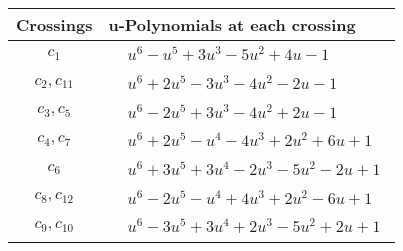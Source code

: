 \documentclass[1p]{elsarticle_modified}
\theoremstyle{definition}
\begin{document}
\begin{tabular}{m{50pt}|m{274pt}}
Crossings & \hspace{64pt}u-Polynomials at each crossing \\
\hline $$\begin{aligned}c_{1}\end{aligned}$$&$\begin{aligned}
&u^6- u^5+3 u^3-5 u^2+4 u-1
\end{aligned}$\\
\hline $$\begin{aligned}c_{2},c_{11}\end{aligned}$$&$\begin{aligned}
&u^6+2 u^5-3 u^3-4 u^2-2 u-1
\end{aligned}$\\
\hline $$\begin{aligned}c_{3},c_{5}\end{aligned}$$&$\begin{aligned}
&u^6-2 u^5+3 u^3-4 u^2+2 u-1
\end{aligned}$\\
\hline $$\begin{aligned}c_{4},c_{7}\end{aligned}$$&$\begin{aligned}
&u^6+2 u^5- u^4-4 u^3+2 u^2+6 u+1
\end{aligned}$\\
\hline $$\begin{aligned}c_{6}\end{aligned}$$&$\begin{aligned}
&u^6+3 u^5+3 u^4-2 u^3-5 u^2-2 u+1
\end{aligned}$\\
\hline $$\begin{aligned}c_{8},c_{12}\end{aligned}$$&$\begin{aligned}
&u^6-2 u^5- u^4+4 u^3+2 u^2-6 u+1
\end{aligned}$\\
\hline $$\begin{aligned}c_{9},c_{10}\end{aligned}$$&$\begin{aligned}
&u^6-3 u^5+3 u^4+2 u^3-5 u^2+2 u+1
\end{aligned}$\\
\hline
\end{tabular}\\~\\
\newpage\renewcommand{\arraystretch}{1}
\end{document}
